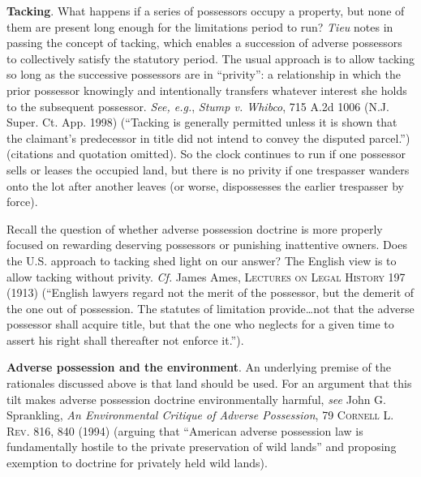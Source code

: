 \item \textbf{Tacking}. What happens if a series of possessors occupy a
property, but none of them are present long enough for the limitations period
to run? \textit{Tieu} notes in passing the concept of tacking, which enables a
succession of adverse possessors to collectively satisfy the statutory period.
The usual approach is to allow tacking so long as the successive possessors are
in ``privity'': a relationship in which the prior possessor knowingly and
intentionally transfers whatever interest she holds to the subsequent
possessor. \textit{See, e.g.}, \emph{Stump v. Whibco}, 715 A.2d 1006 (N.J.
Super. Ct.
App. 1998) (``Tacking is generally permitted unless it is shown that the
claimant's predecessor in title did not intend to convey the disputed
parcel.'') (citations and quotation omitted). So the clock continues to run if
one possessor sells or leases the occupied land, but there is no privity if one
trespasser wanders onto the lot after another leaves (or worse, dispossesses
the earlier trespasser by force). 

Recall the question of whether adverse possession doctrine is more properly
focused on rewarding deserving possessors or punishing inattentive owners. Does
the U.S. approach to tacking shed light on our answer? The English view is to
allow tacking without privity. \textit{Cf.} James Ames, \textsc{Lectures on
Legal History} 197 (1913) (``English lawyers regard not the merit of the
possessor, but the demerit of the one out of possession. The statutes of
limitation provide\ldots not that the adverse possessor shall acquire title,
but that the one who neglects for a given time to assert his right shall
thereafter not enforce it.'').

\item \textbf{Adverse possession and the environment}. An underlying
premise of the rationales discussed above is that land should be used. For an
argument that this tilt makes adverse possession doctrine environmentally
harmful, \textit{see} John G. Sprankling, \textit{An Environmental Critique of
Adverse Possession}, 79 \textsc{Cornell L. Rev}. 816, 840 (1994) (arguing that
``American adverse possession law is fundamentally hostile to the private
preservation of wild lands'' and proposing exemption to doctrine for privately
held wild lands).

